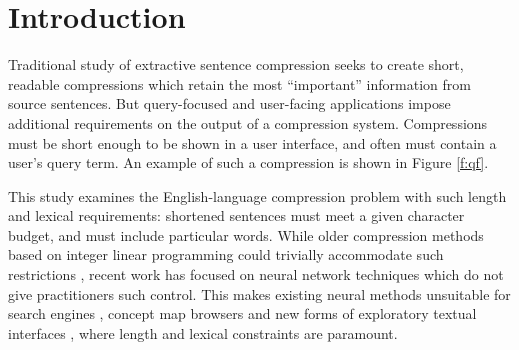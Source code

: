 \documentclass[11pt,a4paper]{article}
\begin{document}
\section{Introduction}

Traditional study of extractive sentence compression seeks to create short, readable compressions which retain the most ``important'' information from source sentences. But query-focused and user-facing applications impose additional requirements on the output of a compression system. Compressions must be short enough to be shown in a user interface, and often must contain a user's query term. An example of such a compression is shown in Figure \ref{f:qf}.


\begin{figure}[htb!]
\end{figure}

This study examines the English-language compression problem with such length and lexical requirements: shortened sentences must meet a given character budget, and must include particular words. While older compression methods based on integer linear programming could trivially accommodate such restrictions \cite{clarke2008global,filippova2013overcoming}, recent work has focused on neural network techniques \cite{filippova2015sentence} which do not give practitioners such control. This makes existing neural methods unsuitable for search engines \cite{hearst2009search}, concept map browsers \cite{falke2017graphdocexplore} and new forms of exploratory textual interfaces \cite{marchionini2006exploratory}, where length and lexical constraints are paramount. 
\end{document}
